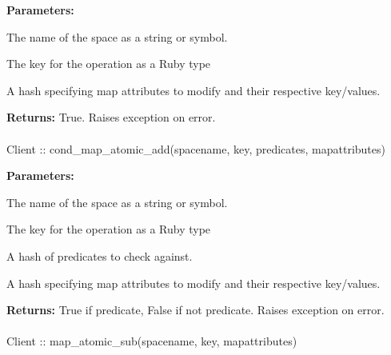 \noindent\textbf{Parameters:}
\begin{description}[labelindent=\widthof{{\code{mapattributes}}},leftmargin=*,noitemsep,nolistsep,align=right]
\item[\code{spacename}] The name of the space as a string or symbol.
\item[\code{key}] The key for the operation as a Ruby type
\item[\code{mapattributes}] A hash specifying map attributes to modify and their respective key/values.
\end{description}

\noindent\textbf{Returns:}
True.  Raises exception on error.

\paragraph{}
\begin{ccode}
Client :: cond_map_atomic_add(spacename, key, predicates, mapattributes)
\end{ccode}
\funcdesc 

\noindent\textbf{Parameters:}
\begin{description}[labelindent=\widthof{{\code{mapattributes}}},leftmargin=*,noitemsep,nolistsep,align=right]
\item[\code{spacename}] The name of the space as a string or symbol.
\item[\code{key}] The key for the operation as a Ruby type
\item[\code{predicates}] A hash of predicates to check against.
\item[\code{mapattributes}] A hash specifying map attributes to modify and their respective key/values.
\end{description}

\noindent\textbf{Returns:}
True if predicate, False if not predicate.  Raises exception on error.

\paragraph{}
\begin{ccode}
Client :: map_atomic_sub(spacename, key, mapattributes)
\end{ccode}
\funcdesc 


